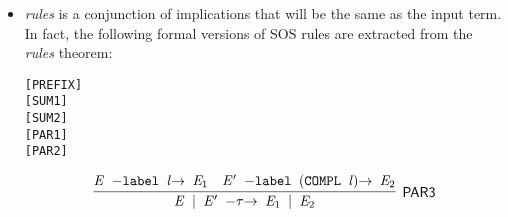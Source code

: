 \begin{itemize}
  \item \emph{rules} is a conjunction of implications that will be the
    same as the input term. In fact, the following formal versions of SOS rules are
    extracted from the \emph{rules} theorem:
\begin{alltt}
\HOLTokenTurnstile{} \HOLSymConst{\ensuremath{\ldotp}} \HOLTokenTransBegin{}\HOLTokenTransEnd {}\hfill\texttt{[PREFIX]}
\HOLTokenTurnstile{}  \HOLTokenTransBegin{}\HOLTokenTransEnd {} \HOLSymConst{\HOLTokenImp{}}  \HOLSymConst{\ensuremath{+}}  \HOLTokenTransBegin{}\HOLTokenTransEnd {}\hfill\texttt{[SUM1]}
\HOLTokenTurnstile{}  \HOLTokenTransBegin{}\HOLTokenTransEnd {} \HOLSymConst{\HOLTokenImp{}}  \HOLSymConst{\ensuremath{+}}  \HOLTokenTransBegin{}\HOLTokenTransEnd {}\hfill\texttt{[SUM2]}
\HOLTokenTurnstile{}  \HOLTokenTransBegin{}\HOLTokenTransEnd {} \HOLSymConst{\HOLTokenImp{}}  \HOLSymConst{\ensuremath{\mid}}  \HOLTokenTransBegin{}\HOLTokenTransEnd {} \HOLSymConst{\ensuremath{\mid}} \hfill\texttt{[PAR1]}
\HOLTokenTurnstile{}  \HOLTokenTransBegin{}\HOLTokenTransEnd {} \HOLSymConst{\HOLTokenImp{}}  \HOLSymConst{\ensuremath{\mid}}  \HOLTokenTransBegin{}\HOLTokenTransEnd {} \HOLSymConst{\ensuremath{\mid}} \hfill\texttt{[PAR2]}
\end{alltt}
\begin{equation*}
\infer[\HOLRuleName{PAR3}]{\HOLinline{\HOLFreeVar{E} \HOLSymConst{\ensuremath{\mid}} \HOLFreeVar{E\sp{\prime}} \HOLTokenTransBegin\HOLSymConst{\ensuremath{\tau}}\HOLTokenTransEnd \HOLFreeVar{E\sb{\mathrm{1}}} \HOLSymConst{\ensuremath{\mid}} \HOLFreeVar{E\sb{\mathrm{2}}}}}{\HOLinline{\HOLFreeVar{E} \HOLTokenTransBegin\HOLConst{label} \HOLFreeVar{l}\HOLTokenTransEnd \HOLFreeVar{E\sb{\mathrm{1}}}}&\HOLinline{\HOLFreeVar{E\sp{\prime}} \HOLTokenTransBegin\HOLConst{label} \ensuremath{(}\HOLConst{COMPL} \HOLFreeVar{l}\ensuremath{)}\HOLTokenTransEnd \HOLFreeVar{E\sb{\mathrm{2}}}}}

\end{equation*}
\end{itemize}
